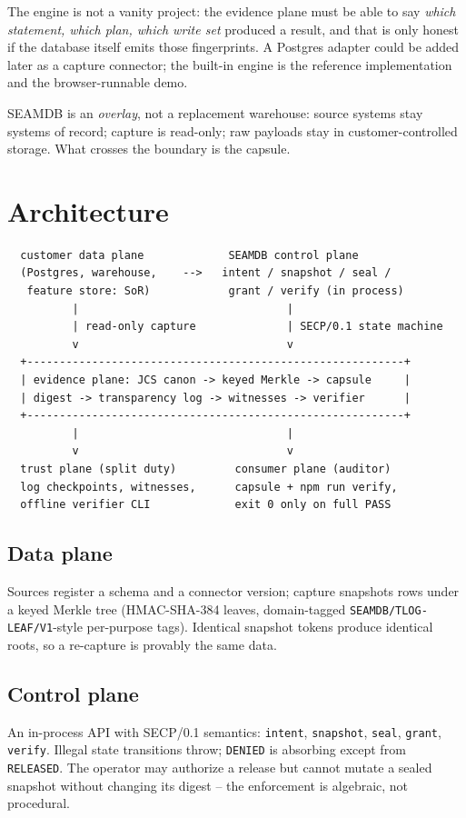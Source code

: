 \documentclass[11pt]{article}
\newcommand{\code}[1]{\texttt{#1}}
\begin{document}
The engine is not a vanity project: the evidence plane must be able to say
\emph{which statement, which plan, which write set} produced a result, and
that is only honest if the database itself emits those fingerprints. A
Postgres adapter could be added later as a capture connector; the built-in
engine is the reference implementation and the browser-runnable demo.

SEAMDB is an \emph{overlay}, not a replacement warehouse: source systems stay
systems of record; capture is read-only; raw payloads stay in
customer-controlled storage. What crosses the boundary is the capsule.

\section{Architecture}
\label{sec:architecture}

\begin{verbatim}
  customer data plane             SEAMDB control plane
  (Postgres, warehouse,    -->   intent / snapshot / seal /
   feature store: SoR)            grant / verify (in process)
          |                                |
          | read-only capture              | SECP/0.1 state machine
          v                                v
  +----------------------------------------------------------+
  | evidence plane: JCS canon -> keyed Merkle -> capsule     |
  | digest -> transparency log -> witnesses -> verifier      |
  +----------------------------------------------------------+
          |                                |
          v                                v
  trust plane (split duty)         consumer plane (auditor)
  log checkpoints, witnesses,      capsule + npm run verify,
  offline verifier CLI             exit 0 only on full PASS
\end{verbatim}

\subsection{Data plane}
Sources register a schema and a connector version; capture snapshots rows
under a keyed Merkle tree (HMAC-SHA-384 leaves, domain-tagged
\code{SEAMDB/TLOG-LEAF/V1}-style per-purpose tags). Identical snapshot tokens
produce identical roots, so a re-capture is provably the same data.

\subsection{Control plane}
An in-process API with SECP/0.1 semantics: \code{intent}, \code{snapshot},
\code{seal}, \code{grant}, \code{verify}. Illegal state transitions throw;
\code{DENIED} is absorbing except from \code{RELEASED}. The operator may
authorize a release but cannot mutate a sealed snapshot without changing its
digest -- the enforcement is algebraic, not procedural.
\end{document}
